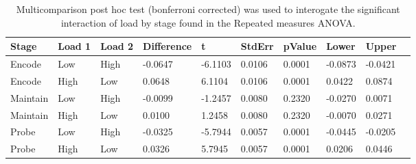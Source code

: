 \begin{table}
\centering
\begin{tabular}[0.2em]{@{}llllllllll@{}}\toprule
Stage & Load 1 & Load 2 & Difference & t & StdErr & pValue & Lower & Upper\\\toprule[0.2em]
Encode & Low & High & -0.0647 & -6.1103 & 0.0106 & 0.0001 & -0.0873 & -0.0421 \\\midrule
Encode & High & Low & 0.0648 & 6.1104 & 0.0106 & 0.0001 & 0.0422 & 0.0874 \\\midrule
Maintain & Low & High & -0.0099 & -1.2457 & 0.0080 & 0.2320 & -0.0270 & 0.0071 \\\midrule
Maintain & High & Low & 0.0100 & 1.2458 & 0.0080 & 0.2320 & -0.0070 & 0.0271 \\\midrule
Probe & Low & High & -0.0325 & -5.7944 & 0.0057 & 0.0001 & -0.0445 & -0.0205 \\\midrule
Probe & High & Low & 0.0326 & 5.7945 & 0.0057 & 0.0001 & 0.0206 & 0.0446 \\\bottomrule[0.2em]
\end{tabular}
\caption{Multicomparison post hoc test (bonferroni corrected) was used to interogate the significant interaction of load by stage found in the Repeated measures ANOVA.\label{tabel:tbl_RMAEFC2_PH_inter}}
\end{table}
